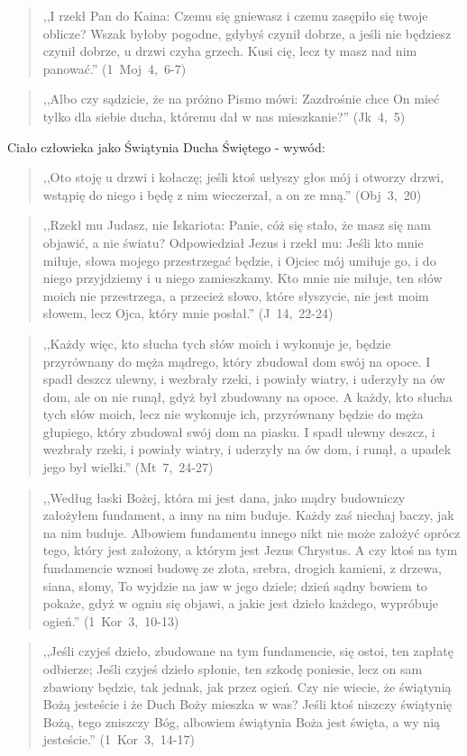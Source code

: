 \documentclass[10pt,a4paper,oneside]{article}
\begin{document}
\begin{quote}
,,I rzekł Pan do Kaina: Czemu się gniewasz i czemu zasępiło się twoje oblicze? Wszak byłoby pogodne, gdybyś czynił dobrze, a jeśli nie będziesz czynił dobrze, u drzwi czyha grzech. Kusi cię, lecz ty masz nad nim panować.'' \mbox{(1 Moj 4, 6-7)}
\end{quote}
\begin{quote}
,,Albo czy sądzicie, że na próżno Pismo mówi: Zazdrośnie chce On mieć tylko dla siebie ducha, któremu dał w nas mieszkanie?'' \mbox{(Jk 4, 5)}
\end{quote}
Ciało człowieka jako Świątynia Ducha Świętego - wywód:
\begin{quote}
,,Oto stoję u drzwi i kołaczę; jeśli ktoś usłyszy głos mój i otworzy drzwi, wstąpię do niego i będę z nim wieczerzał, a on ze mną.'' \mbox{(Obj 3, 20)}
\end{quote}
\begin{quote}
,,Rzekł mu Judasz, nie Iskariota: Panie, cóż się stało, że masz się nam objawić, a nie światu? Odpowiedział Jezus i rzekł mu: Jeśli kto mnie miłuje, słowa mojego przestrzegać będzie, i Ojciec mój umiłuje go, i do niego przyjdziemy i u niego zamieszkamy. Kto mnie nie miłuje, ten słów moich nie przestrzega, a przecież słowo, które słyszycie, nie jest moim słowem, lecz Ojca, który mnie posłał.'' \mbox{(J 14, 22-24)}
\end{quote}
\begin{quote}
,,Każdy więc, kto słucha tych słów moich i wykonuje je, będzie przyrównany do męża mądrego, który zbudował dom swój na opoce. I spadł deszcz ulewny, i wezbrały rzeki, i powiały wiatry, i uderzyły na ów dom, ale on nie runął, gdyż był zbudowany na opoce. A każdy, kto słucha tych słów moich, lecz nie wykonuje ich, przyrównany będzie do męża głupiego, który zbudował swój dom na piasku. I spadł ulewny deszcz, i wezbrały rzeki, i powiały wiatry, i uderzyły na ów dom, i runął, a upadek jego był wielki.'' \mbox{(Mt 7, 24-27)}
\end{quote}
\begin{quote}
,,Według łaski Bożej, która mi jest dana, jako mądry budowniczy założyłem fundament, a inny na nim buduje. Każdy zaś niechaj baczy, jak na nim buduje. Albowiem fundamentu innego nikt nie może założyć oprócz tego, który jest założony, a którym jest Jezus Chrystus. A czy ktoś na tym fundamencie wznosi budowę ze złota, srebra, drogich kamieni, z drzewa, siana, słomy, To wyjdzie na jaw w jego dziele; dzień sądny bowiem to pokaże, gdyż w ogniu się objawi, a jakie jest dzieło każdego, wypróbuje ogień.'' \mbox{(1 Kor 3, 10-13)}
\end{quote}
\begin{quote}
,,Jeśli czyjeś dzieło, zbudowane na tym fundamencie, się ostoi, ten zapłatę odbierze; Jeśli czyjeś dzieło spłonie, ten szkodę poniesie, lecz on sam zbawiony będzie, tak jednak, jak przez ogień. Czy nie wiecie, że świątynią Bożą jesteście i że Duch Boży mieszka w was? Jeśli ktoś niszczy świątynię Bożą, tego zniszczy Bóg, albowiem świątynia Boża jest święta, a wy nią jesteście.'' \mbox{(1 Kor 3, 14-17)}
\end{quote}
\end{document}

